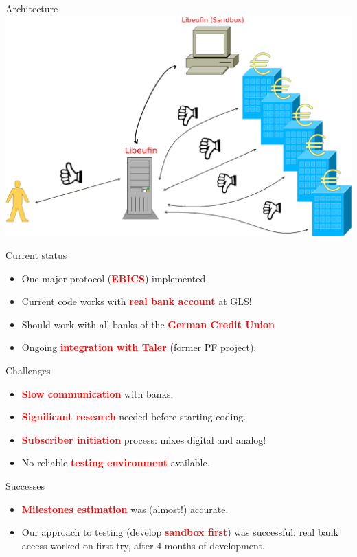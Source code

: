\documentclass[pdf]{beamer}
\newcommand{\boldred}[1]{\textcolor{red}{\textbf{#1}}}
\begin{document}
\begin{frame}{Architecture}
  \includegraphics[height=0.63\textheight]{libeufin.png}
\end{frame}

\begin{frame}{Current status}
  \begin{itemize}
    \item One major protocol (\boldred{EBICS}) implemented
    \item Current code works with \boldred{real bank account} at GLS!
    \item Should work with all banks of the \boldred{German Credit Union}
    \item Ongoing \boldred{integration with Taler} (former PF project).
  \end{itemize}
\end{frame}

\begin{frame}{Challenges}
  \begin{itemize}
    \item \boldred{Slow communication} with banks.
    \item \boldred{Significant research} needed before starting coding.
    \item \boldred{Subscriber initiation} process: mixes digital and analog!
    \item No reliable \boldred{testing environment} available.
  \end{itemize}
\end{frame}

\begin{frame}{Successes}
  \begin{itemize}
    \item \boldred{Milestones estimation} was (almost!) accurate.
    \item Our approach to testing (develop \boldred{sandbox first}) was successful: real bank access
          worked on first try, after 4 months of development.
  \end{itemize}
\end{frame}
\end{document}
